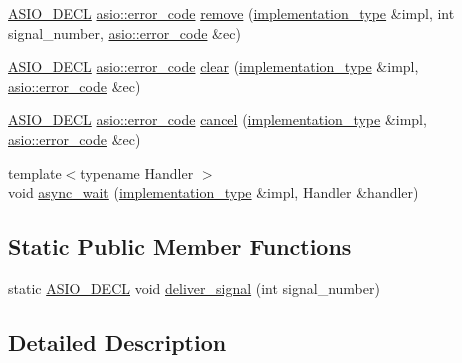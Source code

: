 \begin{DoxyCompactItemize}
\item 
\hyperlink{config_8hpp_ab54d01ea04afeb9a8b39cfac467656b7}{A\+S\+I\+O\+\_\+\+D\+E\+C\+L} \hyperlink{classasio_1_1error__code}{asio\+::error\+\_\+code} \hyperlink{classasio_1_1detail_1_1signal__set__service_a1cc5b3b5a6896100bb32a82323eaf2ed}{remove} (\hyperlink{classasio_1_1detail_1_1signal__set__service_1_1implementation__type}{implementation\+\_\+type} \&impl, int signal\+\_\+number, \hyperlink{classasio_1_1error__code}{asio\+::error\+\_\+code} \&ec)
\item 
\hyperlink{config_8hpp_ab54d01ea04afeb9a8b39cfac467656b7}{A\+S\+I\+O\+\_\+\+D\+E\+C\+L} \hyperlink{classasio_1_1error__code}{asio\+::error\+\_\+code} \hyperlink{classasio_1_1detail_1_1signal__set__service_a2a7bc2f5297471da7f31b70e47d9bb5a}{clear} (\hyperlink{classasio_1_1detail_1_1signal__set__service_1_1implementation__type}{implementation\+\_\+type} \&impl, \hyperlink{classasio_1_1error__code}{asio\+::error\+\_\+code} \&ec)
\item 
\hyperlink{config_8hpp_ab54d01ea04afeb9a8b39cfac467656b7}{A\+S\+I\+O\+\_\+\+D\+E\+C\+L} \hyperlink{classasio_1_1error__code}{asio\+::error\+\_\+code} \hyperlink{classasio_1_1detail_1_1signal__set__service_a5feb0764d63071bb15c50dac6be22bff}{cancel} (\hyperlink{classasio_1_1detail_1_1signal__set__service_1_1implementation__type}{implementation\+\_\+type} \&impl, \hyperlink{classasio_1_1error__code}{asio\+::error\+\_\+code} \&ec)
\item 
{\footnotesize template$<$typename Handler $>$ }\\void \hyperlink{classasio_1_1detail_1_1signal__set__service_a784823b4718e4698c5b52fbbdac29069}{async\+\_\+wait} (\hyperlink{classasio_1_1detail_1_1signal__set__service_1_1implementation__type}{implementation\+\_\+type} \&impl, Handler \&handler)
\end{DoxyCompactItemize}
\subsection*{Static Public Member Functions}
\begin{DoxyCompactItemize}
\item 
static \hyperlink{config_8hpp_ab54d01ea04afeb9a8b39cfac467656b7}{A\+S\+I\+O\+\_\+\+D\+E\+C\+L} void \hyperlink{classasio_1_1detail_1_1signal__set__service_a03a8e1740804a1130505af190bb5f0d0}{deliver\+\_\+signal} (int signal\+\_\+number)
\end{DoxyCompactItemize}


\subsection{Detailed Description}


